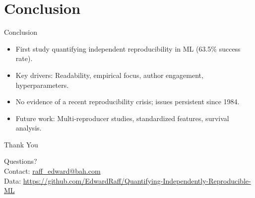 \documentclass[10pt]{beamer}
\begin{document}
\section{Conclusion}

\begin{frame}{Conclusion}
    \begin{itemize}
        \item First study quantifying independent reproducibility in ML (63.5\% success rate).
        \item Key drivers: Readability, empirical focus, author engagement, hyperparameters.
        \item No evidence of a recent reproducibility crisis; issues persistent since 1984.
        \item Future work: Multi-reproducer studies, standardized features, survival analysis.
    \end{itemize}
\end{frame}

\begin{frame}{Thank You}
    \begin{center}
        \Large Questions? \\
        \vspace{0.5cm}
        Contact: \href{mailto:raff_edward@bah.com}{raff_edward@bah.com} \\
        Data: \url{https://github.com/EdwardRaff/Quantifying-Independently-Reproducible-ML}
    \end{center}
\end{frame}
\end{document}
